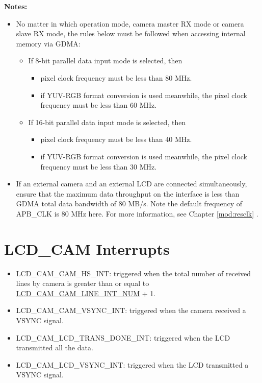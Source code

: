\documentclass[main\_\_EN.tex]{subfiles}
\begin{document}
\textbf{Notes:}
\begin{itemize}
    \item No matter in which operation mode, camera master RX mode or camera slave RX mode, the rules below must be followed when accessing internal memory via GDMA:
\begin{itemize}

    \item If 8-bit parallel data input mode is selected, then
        \begin{itemize}
        \item pixel clock frequency must be less than 80 MHz.
        \item if YUV-RGB format conversion is used meanwhile, the pixel clock frequency must be less than 60 MHz.
    \end{itemize}
    \item If 16-bit parallel data input mode is selected, then
        \begin{itemize}
        \item pixel clock frequency must be less than 40 MHz.
        \item if YUV-RGB format conversion is used meanwhile, the pixel clock frequency must be less than 30 MHz.
    \end{itemize}
\end{itemize}
\item If an external camera and an external LCD are connected simultaneously, ensure that the maximum data throughput on the interface is less than GDMA total data bandwidth of 80 MB/s. Note the default frequency of APB\_CLK is 80 MHz here. For more information, see Chapter \ref{mod:resclk} \textit{}.
\end{itemize}

\section{LCD\_CAM Interrupts} \label{LCDCAM_INT}

\begin{itemize}
\item \label{int:LCDCAMCAMHSINT}LCD\_CAM\_CAM\_HS\_INT: triggered when the total number of received lines by camera is greater than or equal to \hyperref[fielddesc:LCDCAMCAMLINEINTNUM]{LCD\_CAM\_CAM\_LINE\_INT\_NUM} + 1.
\item \label{int:LCDCAMCAMVSYNCINT}LCD\_CAM\_CAM\_VSYNC\_INT: triggered when the camera received a VSYNC signal.
\item \label{int:LCDCAMLCDTRANSDONEINT}LCD\_CAM\_LCD\_TRANS\_DONE\_INT: triggered when the LCD transmitted all the data.
\item \label{int:LCDCAMLCDVSYNCINT}LCD\_CAM\_LCD\_VSYNC\_INT: triggered when the LCD transmitted a VSYNC signal.
\end{itemize}
\end{document}
